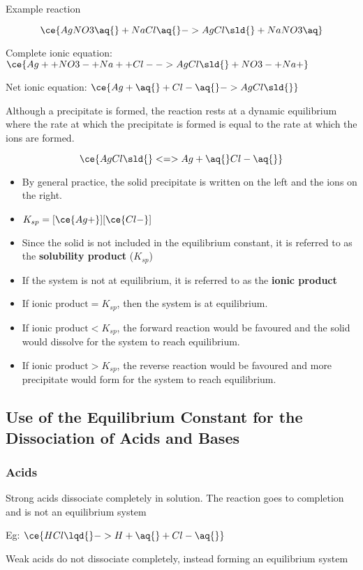 		Example reaction

		$$\ce{AgNO3 \aq{} + NaCl \aq{} -> AgCl \sld{} + NaNO3 \aq}$$

		Complete ionic equation: $\ce{Ag+ + NO3- +Na+ + Cl- -> AgCl \sld{} + NO3- + Na+}$

		Net ionic equation: $\ce{Ag+ \aq{} + Cl- \aq{} -> AgCl \sld{}}$

		Although a precipitate is formed, the reaction rests at a dynamic equilibrium where the rate at which the precipitate is formed is equal to the rate at which the ions are formed.

		$$\ce{AgCl \sld{} <=> Ag+ \aq{} Cl- \aq{}}$$

		\begin{itemize}
			\item By general practice, the solid precipitate is written on the left and the ions on the right.
			\item $K_{sp} = [\ce{Ag+}][\ce{Cl-}]$
			\item Since the solid is not included in the equilibrium constant, it is referred to as the \textbf{solubility product} ($K_{sp}$)
			\item If the system is not at equilibrium, it is referred to as the \textbf{ionic product}
			\item If $\text{ionic product} = K_{sp}$, then the system is at equilibrium.
			\item If $\text{ionic product} < K_{sp}$, the forward reaction would be favoured and the solid would dissolve for the system to reach equilibrium.
			\item If $\text{ionic product} > K_{sp}$, the reverse reaction would be favoured and more precipitate would form for the system to reach equilibrium.
		\end{itemize}

	\subsection{Use of the Equilibrium Constant for the Dissociation of Acids and Bases}
		\subsubsection{Acids}
			Strong acids dissociate completely in solution. The reaction goes to completion and is not an equilibrium system

			\subitem Eg: $\ce{HCl \lqd{} -> H+ \aq{} + Cl- \aq{}}$

			Weak acids do not dissociate completely, instead forming an equilibrium system

